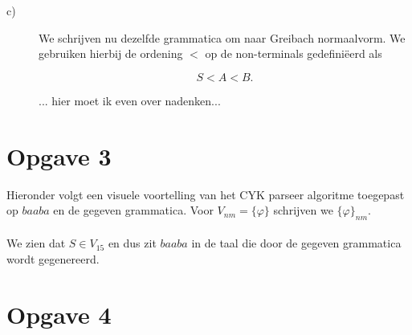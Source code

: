 \documentclass[a4paper,11pt]{article}
\begin{document}
\begin{description}
\item[c)]

We schrijven nu dezelfde grammatica om naar Greibach normaalvorm. We gebruiken
hierbij de ordening $<$ op de non-terminals gedefini\"eerd als

\begin{displaymath}
S < A < B \mbox{.}
\end{displaymath}

... hier moet ik even over nadenken...


\end{description}


\section*{Opgave 3}

Hieronder volgt een visuele voortelling van het CYK parseer algoritme
toegepast op $baaba$ en de gegeven grammatica. Voor $V_{nm}=\{\varphi\}$
schrijven we $\{\varphi\}_{nm}$.\\[1em]

\\[1em]

We zien dat $S \in V_{15}$ en dus zit $baaba$ in de taal die door de gegeven
grammatica wordt gegenereerd.


\section*{Opgave 4}
\end{document}

